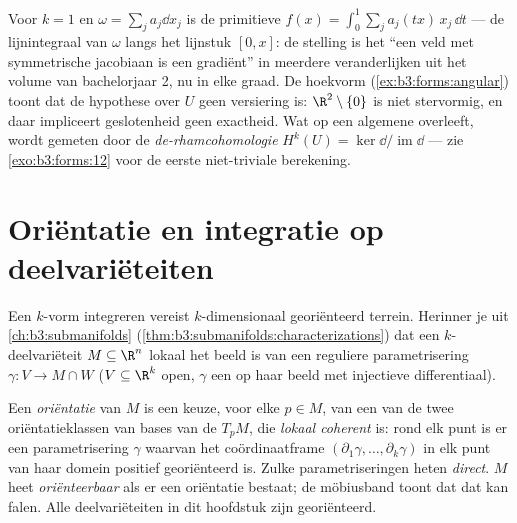 \begin{remark}
Voor $k = 1$ en $\omega = \sum_j a_j\dd x_j$ is de primitieve
$f(x) = \int_0^1\sum_ja_j(tx)\,x_j\,\dd t$ --- de lijnintegraal
van $\omega$ langs het lijnstuk $[0, x]$: de stelling is het
``een veld met symmetrische jacobiaan is een gradiënt'' in
meerdere veranderlijken uit het volume van bachelorjaar 2, nu in
elke graad. De hoekvorm (\cref{ex:b3:forms:angular}) toont dat de
hypothese over $U$ geen versiering is: $\R^2\setminus\{0\}$ is
niet stervormig, en daar impliceert geslotenheid geen exactheid.
Wat op een algemene  overleeft, wordt gemeten
door de \emph{de-rhamcohomologie} $H^k(U) =
\ker\dd/\operatorname{im}\dd$ --- zie \cref{exo:b3:forms:12} voor
de eerste niet-triviale berekening.
\end{remark}

\section{Oriëntatie en integratie op deelvariëteiten}

Een $k$-vorm integreren vereist $k$-dimensionaal georiënteerd
terrein. Herinner je uit \cref{ch:b3:submanifolds}
(\cref{thm:b3:submanifolds:characterizations}) dat een
$k$-deelvariëteit $M \subseteq \R^n$ lokaal het beeld is van een
reguliere parametrisering $\gamma\colon V \to M \cap W$ ($V
\subseteq \R^k$ open, $\gamma$ een  op haar beeld
met injectieve differentiaal).

\begin{definition}\label{def:b3:forms:orientation}
Een \emph{oriëntatie} van $M$ is een keuze,
voor elke $p \in M$, van een van de twee oriëntatieklassen van
bases van de  $T_pM$, die \emph{lokaal coherent} is:
rond elk punt is er een parametrisering $\gamma$ waarvan het
coördinaatframe $(\partial_1\gamma, \dots, \partial_k\gamma)$ in
elk punt van haar domein positief georiënteerd is. Zulke
parametriseringen heten \emph{direct}. $M$ heet
\emph{oriënteerbaar} als er een oriëntatie bestaat; de
möbiusband toont dat dat kan falen. Alle deelvariëteiten in dit
hoofdstuk zijn georiënteerd.
\end{definition}

